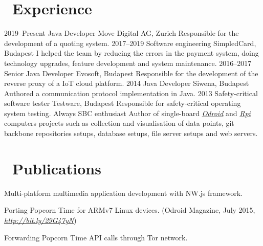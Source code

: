 \documentclass[hidelinks,11pt]{friggeri-cv}
\def\book{{\FA \faBook}}
\def\suitcase{{\FA \faSuitcase}}
\begin{document}
\section{{\suitcase}\ Experience}
\begin{entrylist}
    \entry
    {2019--Present}
    {Java Developer}
    {Move Digital AG, Zurich}
    {Responsible for the development of a quoting system.}
    \entry
    {2017--2019}
    {Software engineering}
    {SimpledCard, Budapest}
    {I helped the team by reducing the errors in the payment system, doing technology upgrades, feature development and system maintenance.}
    \entry
    {2016--2017}
    {Senior Java Developer}
    {Evosoft, Budapest}
    {Responsible for the development of the reverse proxy of a IoT cloud platform.}
    \entry
    {2014}
    {Java Developer}
    {Siwena, Budapest}
    {Authored a communication protocol implementation in Java.}
    \entry
    {2013}
    {Safety-critical software tester}
    {Testware, Budapest}
    {Responsible for safety-critical operating system testing.}
    \entry
    {Always}
    {SBC enthusiast}
    {}
    {Author of single-board \textit{\href{http://www.hardkernel.com/main/main.php}{Odroid}} and \textit{\href{https://www.raspberrypi.org}{Rpi}} computers projects such as collection and visualisation of data points, git backbone repositories setups, database setups, file server setups and web servers.}
\end{entrylist}

\section{{\book}\ Publications}
Multi-platform multimedia application development with NW.js framework.

Porting Popcorn Time for ARMv7 Linux devices.
{\small (Odroid Magazine, July 2015, \textit{\href{http://bit.ly/29G47yN}{http://bit.ly/29G47yN}})}

Forwarding Popcorn Time API calls through Tor network.
\end{document}
